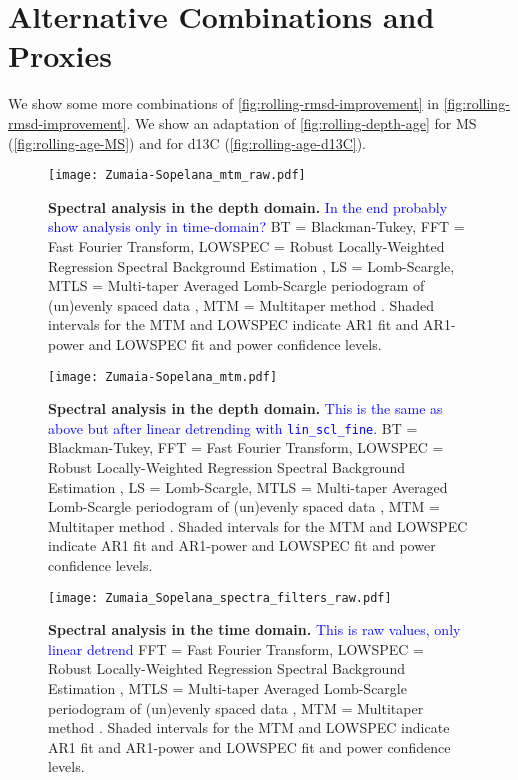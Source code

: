 \documentclass[draft]{agujournal2019}
\newcommand{\ijk}{\textcolor{blue}}
\begin{document}
\section{Alternative Combinations and Proxies}

We show some more combinations of \cref{fig:rolling-rmsd-improvement} in \cref{fig:rolling-rmsd-improvement}.
We show an adaptation of \cref{fig:rolling-depth-age} for \gls{MS} (\cref{fig:rolling-age-MS}) and for \gls{d13C} (\cref{fig:rolling-age-d13C}).

\begin{figure}[htb]
  \centering \texttt{[image: Zumaia-Sopelana\_mtm\_raw.pdf]}
  \caption{\label{fig:spectral-depth}
    \textbf{Spectral analysis in the depth domain.}
    \ijk{In the end probably show analysis only in time-domain?}
    BT = Blackman-Tukey,
    FFT = Fast Fourier Transform,
    LOWSPEC = Robust Locally-Weighted Regression Spectral Background Estimation \cite{Meyers2012},
    LS = Lomb-Scargle,
    MTLS = Multi-taper Averaged Lomb-Scargle periodogram of (un)evenly
spaced data \cite{Springford2020},
    MTM = Multitaper method \cite{Thomson1982}.
    Shaded intervals for the MTM and LOWSPEC indicate AR1 fit and AR1-power and LOWSPEC fit and power confidence levels.
  }
\end{figure}

\begin{figure}[htb]
  \centering \texttt{[image: Zumaia-Sopelana\_mtm.pdf]}
  \caption{\label{fig:spectral-depth}
    \textbf{Spectral analysis in the depth domain.}
    \ijk{This is the same as above but after linear detrending with \texttt{lin\_scl\_fine}.}
    BT = Blackman-Tukey,
    FFT = Fast Fourier Transform,
    LOWSPEC = Robust Locally-Weighted Regression Spectral Background Estimation \cite{Meyers2012},
    LS = Lomb-Scargle,
    MTLS = Multi-taper Averaged Lomb-Scargle periodogram of (un)evenly
spaced data \cite{Springford2020},
    MTM = Multitaper method \cite{Thomson1982}.
    Shaded intervals for the MTM and LOWSPEC indicate AR1 fit and AR1-power and LOWSPEC fit and power confidence levels.
  }
\end{figure}


\begin{figure}[htb]
  \centering \texttt{[image: Zumaia\_Sopelana\_spectra\_filters\_raw.pdf]}
  \caption{\label{fig:spectral-age-raw}
    \textbf{Spectral analysis in the time domain.}
    \ijk{This is raw values, only linear detrend}
    FFT = Fast Fourier Transform,
    LOWSPEC = Robust Locally-Weighted Regression Spectral Background Estimation \cite{Meyers2012},
    MTLS = Multi-taper Averaged Lomb-Scargle periodogram of (un)evenly
spaced data \cite{Springford2020},
    MTM = Multitaper method \cite{Thomson1982}.
    Shaded intervals for the MTM and LOWSPEC indicate AR1 fit and AR1-power and LOWSPEC fit and power confidence levels.
  }
\end{figure}
\end{document}
